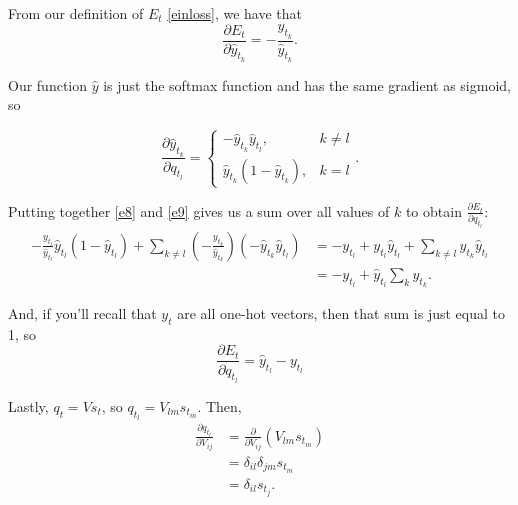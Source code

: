 \documentclass[11pt,twoside]{article}
\begin{document}
\noindent From our definition of $E_t$ \eqref{einloss}, we have that 
\begin{equation}
\label{e8}
\frac{\partial E_t}{\partial \hat{y}_{t_k}}=-\frac{y_{t_k}}{\hat{y}_{t_k}}.
\end{equation}

\noindent Our function $\hat{y}$ is just the softmax function and has the same gradient as sigmoid, so

\begin{equation}
\label{e9}
\frac{\partial \hat{y}_{t_k}}{\partial q_{t_l}}=\left\{
	\begin{array}{lr}
	-\hat{y}_{t_k}\hat{y}_{t_l}, & k\neq l \\
	\hat{y}_{t_k}\left(1-\hat{y}_{t_k}\right), & k=l
	\end{array}
	\right..
\end{equation}


\noindent Putting together \eqref{e8} and \eqref{e9} gives us a sum over all values of $k$ to obtain $\frac{\partial E_t}{\partial q_{t_l}}$:
\begin{subequations}
\begin{align}
-\frac{y_{t_l}}{\hat{y}_{t_l}}\hat{y}_{t_l}\left(1-\hat{y}_{t_l}\right)+\sum_{k\ne l}{}\left(-\frac{y_{t_k}}{\hat{y}_{t_k}}\right)\left(-\hat{y}_{t_k}\hat{y}_{t_l}\right) 
&= -y_{t_l}+y_{t_l}\hat{y}_{t_l}+\sum_{k\ne l}{}y_{t_k}\hat{y}_{t_l} \\
&= -y_{t_l} + \hat{y}_{t_l}\sum_{k}{}y_{t_k}.
\end{align}
\end{subequations}

\noindent And, if you'll recall that $y_t$ are all one-hot vectors, then that sum is just equal to 1, so
\begin{equation}
\label{diff}
\frac{\partial E_t}{\partial q_{t_l}}=\hat{y}_{t_l}-y_{t_l}
\end{equation}


\noindent Lastly, $q_t=V s_t$, so $q_{t_l}=V_{l m}s_{t_m}$. Then,
\begin{subequations}
\begin{align}
\frac{\partial q_{t_l}}{\partial V_{i j}} &= \frac{\partial }{\partial V_{i j}}\left(V_{l m} s_{t_m}\right) \\
	&= \delta_{i l}\delta_{j m}s_{t_m} \\
\label{qlV}
	&= \delta_{i l}s_{t_j}.
\end{align}
\end{subequations}
\end{document}
